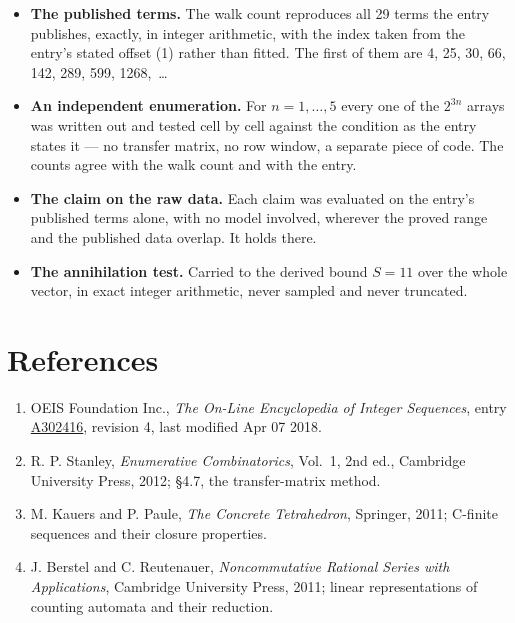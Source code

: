 \documentclass[11pt]{article}
\theoremstyle{definition}
\begin{document}
\begin{itemize}

\item {\bfseries The published terms.} The walk count reproduces all 29 terms the entry publishes, exactly, in integer arithmetic, with the index taken from the entry's stated offset (1) rather than fitted. The first of them are 4, 25, 30, 66, 142, 289, 599, 1268,~\dots

\item {\bfseries An independent enumeration.} For $n = 1,\dots,5$ every one of the $2^{3n}$ arrays was written out and tested cell by cell against the condition as the entry states it --- no transfer matrix, no row window, a separate piece of code. The counts agree with the walk count and with the entry.

\item {\bfseries The claim on the raw data.} Each claim was evaluated on the entry's published terms alone, with no model involved, wherever the proved range and the published data overlap. It holds there.

\item {\bfseries The annihilation test.} Carried to the derived bound $S = 11$ over the whole vector, in exact integer arithmetic, never sampled and never truncated.

\end{itemize}

\section{References}

\begin{enumerate}

\item OEIS Foundation Inc., \emph{The On-Line Encyclopedia of Integer Sequences}, entry \href{https://oeis.org/A302416}{A302416}, revision 4, last modified Apr 07 2018.

\item R. P. Stanley, \emph{Enumerative Combinatorics}, Vol.~1, 2nd ed., Cambridge University Press, 2012; \S4.7, the transfer-matrix method.

\item M. Kauers and P. Paule, \emph{The Concrete Tetrahedron}, Springer, 2011; C-finite sequences and their closure properties.

\item J. Berstel and C. Reutenauer, \emph{Noncommutative Rational Series with Applications}, Cambridge University Press, 2011; linear representations of counting automata and their reduction.

\end{enumerate}
\end{document}
